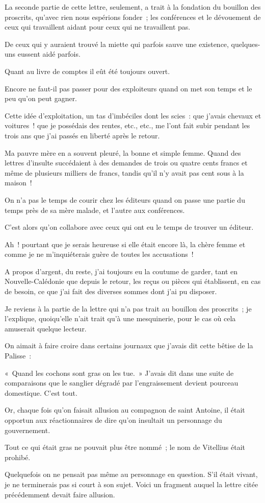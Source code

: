 \documentclass[french,twoside]{book} %
\begin{document}
\noindent La seconde partie de cette lettre, seulement, a trait à la fondation du bouillon des proscrits, qu’avec rien nous espérions fonder ; les conférences et le dévouement de ceux qui travaillent aidant pour ceux qui ne travaillent pas.\par
De ceux qui y auraient trouvé la miette qui parfois sauve une existence, quelques-uns eussent aidé parfois.\par
Quant au livre de comptes il eût été toujours ouvert.\par
Encore ne faut-il pas passer pour des exploiteurs quand on met son temps et le peu qu’on peut gagner.\par
Cette idée d’exploitation, un tas d’imbéciles dont les scies : que j’avais chevaux et voitures ! que je possédais des rentes, etc., etc., me l’ont fait subir pendant les trois ans que j’ai passés en liberté après le retour.\par
Ma pauvre mère en a souvent pleuré, la bonne et simple femme. Quand des lettres d’insulte succédaient à des demandes de trois ou quatre cents francs et même de plusieurs milliers de  francs, tandis qu’il n’y avait pas cent sous à la maison !\par
On n’a pas le temps de courir chez les éditeurs quand on passe une partie du temps près de sa mère malade, et l’autre aux conférences.\par
C’est alors qu’on collabore avec ceux qui ont eu le temps de trouver un éditeur.\par
Ah ! pourtant que je serais heureuse si elle était encore là, la chère femme et comme je ne m’inquiéterais guère de toutes les accusations !\par
A propos d’argent, du reste, j’ai toujours eu la coutume de garder, tant en Nouvelle-Calédonie que depuis le retour, les reçus ou pièces qui établissent, en cas de besoin, ce que j’ai fait des diverses sommes dont j’ai pu disposer.\par
Je reviens à la partie de la lettre qui n’a pas trait au bouillon des proscrits ; je l’explique, quoiqu’elle n’ait trait qu’à une mesquinerie, pour le cas où cela amuserait quelque lecteur.\par
On aimait à faire croire dans certains journaux que j’avais dit cette bêtise de la Palisse :\par
« Quand les cochons sont gras on les tue. » J’avais dit dans une suite de comparaisons que le sanglier dégradé par l’engraissement devient pourceau domestique. C’est tout.\par
Or, chaque fois qu’on faisait allusion au compagnon de saint Antoine, il était opportun aux  réactionnaires de dire qu’on insultait un personnage du gouvernement.\par
Tout ce qui était gras ne pouvait plus être nommé ; le nom de Vitellius était prohibé.\par
Quelquefois on ne pensait pas même au personnage en question. S’il était vivant, je ne terminerais pas si court à son sujet. Voici un fragment auquel la lettre citée précédemment devait faire allusion.\par
\end{document}
